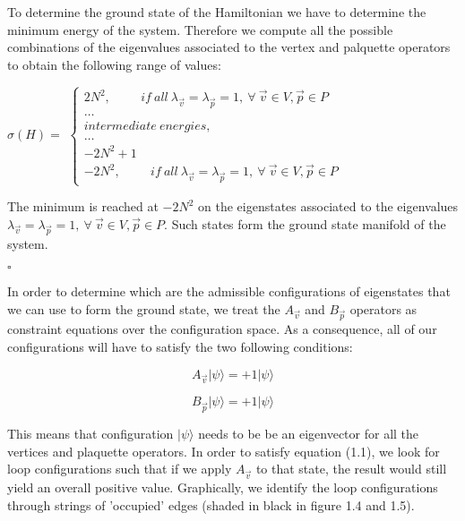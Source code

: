 \documentclass{Configuration_Files/PoliMi3i_thesis}
\begin{document}
To determine the ground state of the Hamiltonian we have to determine the minimum energy of the system. Therefore we compute all the possible combinations of the eigenvalues associated to the vertex and palquette operators to obtain the following range of values:

\begin{center}
	$\sigma( H) =$
	$\begin{cases}
		2N^2, \hspace{1cm} if \ all\ \lambda_{\vec{v}}= \lambda_{\vec{p}}=1, \  \forall \ \vec{v} \in V , \vec{p} \in P\\
		\dots\\
		intermediate \ energies,\\
		\dots\\
		-2N^2+1\\
		-2N^2, \hspace{1cm} if \ all\ \lambda_{\vec{v}}= \lambda_{\vec{p}}=1, \  \forall \ \vec{v} \in V, \vec{p} \in P
	\end{cases}$
	
\end{center}

The minimum is reached at $-2N^2$ on the eigenstates  associated to the eigenvalues $\lambda_{\vec{v}}= \lambda_{\vec{p}}=1, \  \forall \ \vec{v} \in V, \vec{p} \in P$.
Such states form the ground state manifold of the system.\newline

\hfill $\square$


In order to determine which are the admissible configurations of eigenstates that we can use to form the ground state, we treat the $A_{\vec{v}} $ and $B_{\vec{p}} $ operators as constraint equations over the configuration space.
As a consequence, all of our configurations will have to satisfy the two following conditions:

\begin{equation}
	A_{\vec{v}} |\psi\rangle = +1|\psi\rangle
\end{equation}

\begin{equation}
	B_{\vec{p}} |\psi\rangle = +1|\psi\rangle
\end{equation}

This means that configuration $|\psi\rangle$ needs to be be an eigenvector for all the vertices and plaquette operators. \newline
In order to satisfy equation (1.1), we look for loop configurations such that if we apply $A_{\vec{v}} $ to that state, the result would still yield an overall positive value.\newline
Graphically, we identify the loop configurations through strings of 'occupied' edges (shaded in black in figure 1.4 and 1.5).
\end{document}

